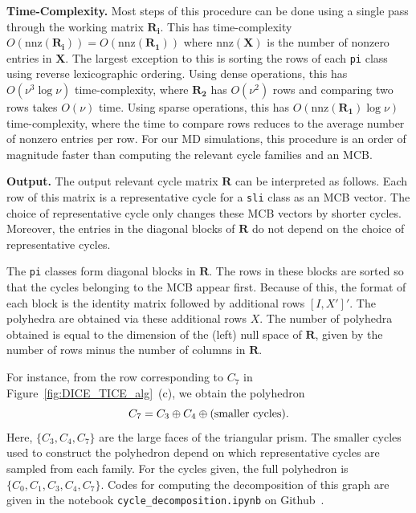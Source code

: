\documentclass[fleqn,11pt]{article}
\newcommand\smCyc{\textnormal{(smaller cycles)}}
\begin{document}
\textbf{Time-Complexity.} Most steps of this procedure can be done using a single pass through the working matrix $\bm{R_i}$. This has time-complexity $O(\text{nnz}(\bm{R_i}))=O(\text{nnz}(\bm{R_1}))$ where $\text{nnz}(\bm{X})$ is the number of nonzero entries in $\bm{X}$. 
The largest exception to this is sorting the rows of each {\tt pi} class using reverse lexicographic ordering. 
Using dense operations, this has $O(\nu^3\log\nu)$ time-complexity, where $\bm{R_2}$ has $O(\nu^2)$ rows and comparing two rows takes $O(\nu)$ time. Using sparse operations, this has $O(\text{nnz}(\bm{R_1})\log\nu)$ time-complexity, where the time to compare rows reduces to the average number of nonzero entries per row.
For our MD simulations, this procedure is an order of magnitude faster than computing the relevant cycle families and an MCB.

\textbf{Output.} The output relevant cycle matrix $\bm{R}$ can be interpreted as follows. Each row of this matrix is a representative cycle for a {\tt sli} class as an MCB vector. The choice of representative cycle only changes these MCB vectors by shorter cycles. Moreover, the entries in the diagonal blocks of $\bm{R}$ do not depend on the choice of representative cycles.

The {\tt pi} classes form diagonal blocks in $\bm{R}$. The rows in these blocks are sorted so that the cycles belonging to the MCB appear first. Because of this, the format of each block is the identity matrix followed by additional rows $[I,X']'$. The polyhedra are obtained via these additional rows $X$. The number of polyhedra obtained is equal to the dimension of the (left) null space of $\bm{R}$, given by the number of rows minus the number of columns in $\bm{R}$. 

For instance, from the row corresponding to $C_7$ in Figure~\ref{fig:DICE_TICE_alg}~(c), we obtain the polyhedron
\begin{equation}
	C_7 = C_3\oplus C_4\oplus\smCyc.
\end{equation}
Here, $\{C_3,C_4,C_7\}$ are the large faces of the triangular prism. The smaller cycles used to construct the polyhedron depend on which representative cycles are sampled from each family. For the cycles given, the full polyhedron is $\{C_0,C_1,C_3,C_4,C_7\}$.
{Codes for computing the decomposition of this graph are given in the notebook {\tt cycle\_decomposition.ipynb} on Github~\cite{ruthCyclic2025}.}
\end{document}
